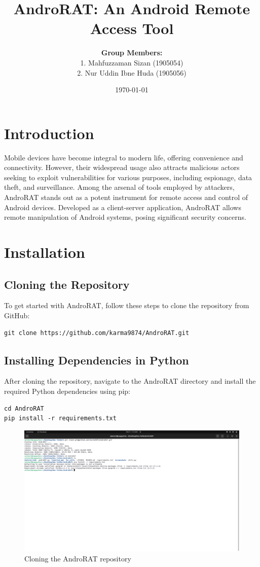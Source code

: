 \documentclass[12pt]{article}
\title{
    \textbf{AndroRAT: An Android Remote Access Tool}}
\author{ 
    \textbf{Group Members:}\\
    1. Mahfuzzaman Sizan (1905054)\\
    2. Nur Uddin Ibne Huda (1905056)
}
\date{\today}
\begin{document}
\maketitle
\tableofcontents

\section{Introduction}
Mobile devices have become integral to modern life, offering convenience and connectivity. However, their widespread usage also attracts malicious actors seeking to exploit vulnerabilities for various purposes, including espionage, data theft, and surveillance. Among the arsenal of tools employed by attackers, AndroRAT stands out as a potent instrument for remote access and control of Android devices. Developed as a client-server application, AndroRAT allows remote manipulation of Android systems, posing significant security concerns.

\section{Installation}

\subsection{Cloning the Repository}
To get started with AndroRAT, follow these steps to clone the repository from GitHub:

\begin{lstlisting}[style=shell]
git clone https://github.com/karma9874/AndroRAT.git
\end{lstlisting}

\subsection{Installing Dependencies in Python}
After cloning the repository, navigate to the AndroRAT directory and install the required Python dependencies using pip:

\begin{lstlisting}[style=shell]
cd AndroRAT
pip install -r requirements.txt
\end{lstlisting}
\begin{figure}[h!]
  \centering
  \includegraphics[width=0.6\linewidth]{gitclone.png}
  \caption{Cloning the AndroRAT repository}
\end{figure}
\end{document}

